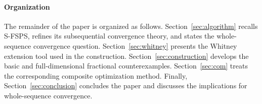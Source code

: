 \documentclass[11pt]{article}
\numberwithin{equation}{section}
\begin{document}
\paragraph{Organization}
The remainder of the paper is organized as follows.
Section~\ref{sec:algorithm} recalls S-FSPS, refines its subsequential
convergence theory, and states the whole-sequence convergence question.
Section~\ref{sec:whitney} presents the Whitney extension tool used in the
construction. Section~\ref{sec:construction} develops the basic and
full-dimensional fractional counterexamples. Section~\ref{sec:com}
treats the corresponding composite optimization method. Finally,
Section~\ref{sec:conclusion} concludes the paper and discusses the implications
for whole-sequence convergence.
%
%
%
\end{document}
